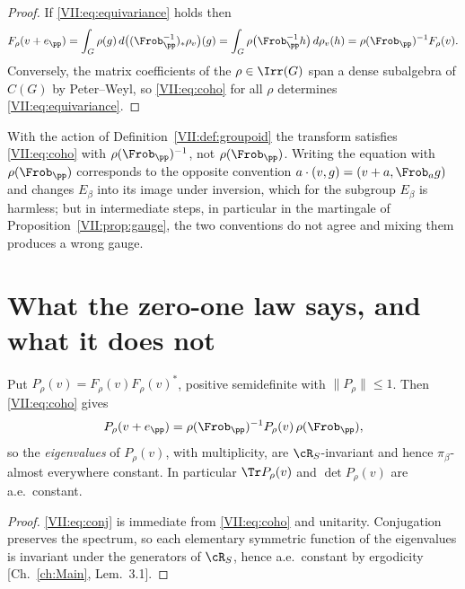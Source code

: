\begin{proof}
If \eqref{VII:eq:equivariance} holds then
\[
F_\rho(v+e_\pp)=\int_G\rho(g)\,d\bigl((\Frob_\pp^{-1})_*\rho_v\bigr)(g)
=\int_G\rho\bigl(\Frob_\pp^{-1}h\bigr)\,d\rho_v(h)
=\rho(\Frob_\pp)^{-1}F_\rho(v).
\]
Conversely, the matrix coefficients of the $\rho\in\Irr(G)$ span a dense subalgebra of $C(G)$
by Peter--Weyl, so \eqref{VII:eq:coho} for all $\rho$ determines \eqref{VII:eq:equivariance}.
\end{proof}

\begin{remark}\label{VII:rem:inverse}
With the action of Definition~\ref{VII:def:groupoid} the transform satisfies \eqref{VII:eq:coho} with
$\rho(\Frob_\pp)^{-1}$, not $\rho(\Frob_\pp)$. Writing the equation with
$\rho(\Frob_\pp)$ corresponds to the opposite convention $a\cdot(v,g)=(v+a,\Frob_ag)$ and
changes $E_\beta$ into its image under inversion, which for the subgroup $E_\beta$ is
harmless; but in intermediate steps, in particular in the martingale of
Proposition~\ref{VII:prop:gauge}, the two conventions do not agree and mixing them produces a
wrong gauge.
\end{remark}

\section{What the zero-one law says, and what it does not}

\begin{proposition}\label{VII:prop:zeroone}
Put $P_\rho(v)=F_\rho(v)F_\rho(v)^*$, positive semidefinite with $\|P_\rho\|\le1$. Then
\eqref{VII:eq:coho} gives
\begin{equation}\label{VII:eq:conj}
P_\rho(v+e_\pp)=\rho(\Frob_\pp)^{-1}P_\rho(v)\,\rho(\Frob_\pp),
\end{equation}
so the \emph{eigenvalues} of $P_\rho(v)$, with multiplicity, are $\cR_S$-invariant and hence
$\pi_\beta$-almost everywhere constant. In particular $\Tr P_\rho(v)$ and $\det P_\rho(v)$
are a.e.\ constant.
\end{proposition}

\begin{proof}
\eqref{VII:eq:conj} is immediate from \eqref{VII:eq:coho} and unitarity. Conjugation preserves the
spectrum, so each elementary symmetric function of the eigenvalues is invariant under the
generators of $\cR_S$, hence a.e.\ constant by ergodicity [Ch.~\ref{ch:Main}, Lem.~3.1].
\end{proof}

